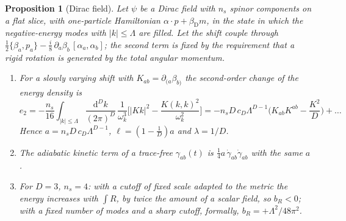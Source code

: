 \documentclass[11pt,a4paper]{article}
\theoremstyle{stmt}
\newtheorem{proposition}[theorem]{Proposition}
\theoremstyle{defn}
\theoremstyle{rmk}
\numberwithin{equation}{section}
\newcommand{\dd}{\mathrm{d}}
\begin{document}
\begin{proposition}[Dirac field]\label{prop:dirac}
Let $\psi$ be a Dirac field with $n_s$ spinor components on a flat slice, with one-particle Hamiltonian $\alpha\cdot p+\beta_{\mathrm D}m$, in the state in which the negative-energy modes with $|k|\le\Lambda$ are filled. Let the shift couple through $\tfrac12\{\beta_a,p_a\}-\tfrac i8\,\partial_a\beta_b\,[\alpha_a,\alpha_b]$; the second term is fixed by the requirement that a rigid rotation is generated by the total angular momentum.
\begin{enumerate}[label=\textup{(\roman*)}]
\item For a slowly varying shift with $K_{ab}=\partial_{(a}\beta_{b)}$ the second-order change of the energy density is
\begin{equation}\label{eq:e2dirac}
e_2=-\frac{n_s}{16}\int_{|k|\le\Lambda}\frac{\dd^Dk}{(2\pi)^D}\,\frac{1}{\omega_k^3}\Big[|Kk|^2-\frac{K(k,k)^2}{\omega_k^2}\Big]
=-n_sD\,c_D\Lambda^{D-1}\Big(K_{ab}K^{ab}-\frac{K^2}{D}\Big)+\dots
\end{equation}
Hence $a=n_sD\,c_D\Lambda^{D-1}$, $\ell=(1-\tfrac1D)a$ and $\lambda=1/D$.
\item The adiabatic kinetic term of a trace-free $\gamma_{ab}(t)$ is $\tfrac14a\,\dot\gamma_{ab}\dot\gamma_{ab}$ with the same $a$.
\item For $D=3$, $n_s=4$: with a cutoff of fixed scale adapted to the metric the energy increases with $\int R$, by twice the amount of a scalar field, so $b_R<0$; with a fixed number of modes and a sharp cutoff, formally, $b_R=+\Lambda^2/48\pi^2$.
\end{enumerate}
\end{proposition}
\end{document}
